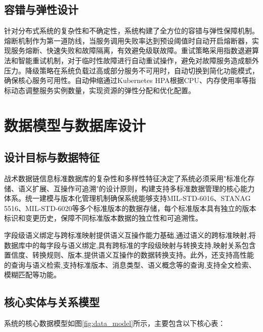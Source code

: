 \subsection{容错与弹性设计}

针对分布式系统的复杂性和不确定性，系统构建了全方位的容错与弹性保障机制。熔断机制作为第一道防线，当服务调用失败率达到预设阈值时自动开启熔断器，实现服务熔断、快速失败和故障隔离，有效避免级联故障。重试策略采用指数退避算法和智能重试机制，对于临时性故障进行自动重试操作，避免对故障服务造成额外压力。降级策略在系统负载过高或部分服务不可用时，自动切换到简化功能模式，确保核心服务可用性。自动伸缩通过Kubernetes HPA根据CPU、内存使用率等指标动态调整服务实例数量，实现资源的弹性分配和优化配置。

\section{数据模型与数据库设计}

\subsection{设计目标与数据特征}

战术数据链信息标准数据库的复杂性和多样性特征决定了系统必须采用"标准化存储、语义扩展、互操作可追溯"的设计原则，构建支持多标准数据管理的核心能力体系。统一建模与版本化管理机制确保系统能够支持MIL-STD-6016、STANAG 5516、MIL-STD-6020等多个标准版本的数据存储，每个标准版本具有独立的版本标识和变更历史，保障不同标准版本数据的独立性和可追溯性。

字段级语义绑定与跨标准映射提供语义互操作能力基础,通过语义的跨标准映射,将数据库中的每字段与语义绑定,具有跨标准的字段级映射与转换支持,映射关系包含置信度、转换规则、版本,提供语义互操作的数据转换支持。此外，还支持高性能的查询与语义检索,支持标准版本、消息类型、语义概念等的查询,支持全文检索、模糊匹配等功能。
\subsection{核心实体与关系模型}

系统的核心数据模型如图\ref{fig:data_model}所示，主要包含以下核心表：

